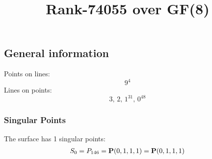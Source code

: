 \documentclass{article}
\newcommand\setTBstruts{\def\T{\rule{0pt}{2.6ex}}%
\def\B{\rule[-1.2ex]{0pt}{0pt}}}
\newcommand{\bP}{{\bf P}}
\begin{document}
 
\setTBstruts



{\allowdisplaybreaks%






\title{Rank-74055 over GF(8)}
\author{}%
\maketitle%
%
{}



\subsection*{General information}
Points on lines:
$$
9^4$$
Lines on points:
$$
3,\,2,\,1^{31},\,0^{48}$$
\subsubsection*{Singular Points}
The surface has 1 singular points:\\
\begin{align*}
S_{0} &= P_{146}=\bP(0, 1, 1, 1) = \bP(0, 1, 1, 1)\\
\end{align*}
}
\end{document}
